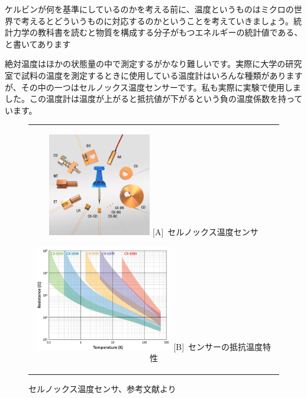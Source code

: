 \documentclass[10pt,b5paper,papersize,dvipdfmx]{jsbook}
\begin{document}
ケルビンが何を基準にしているのかを考える前に、温度というものはミクロの世界で考えるとどういうものに対応するのかということを考えていきましょう。統計力学の教科書を読むと物質を構成する分子がもつエネルギーの統計値である、と書いてあります\par
絶対温度はほかの状態量の中で測定するがかなり難しいです。実際に大学の研究室で試料の温度を測定するときに使用している温度計はいろんな種類がありますが、その中の一つはセルノックス温度センサーです。私も実際に実験で使用しました。この温度計は温度が上がると抵抗値が下がるという負の温度係数を持っています。
\begin{figure}[htbp]
  \begin{center}
      \begin{tabular}{c}
      \begin{minipage}{0.5\hsize}
          \begin{center}
          \includegraphics[clip, width=4.5cm]{img/cryotronics.png}
          \hspace{1.6cm} [A]\ セルノックス温度センサ
          \end{center}
      \end{minipage}
      \begin{minipage}{0.5\hsize}
          \begin{center}
          \includegraphics[clip, width=6cm]{img/CX-chart-1.png}
          \hspace{1.6cm} [B]\ センサーの抵抗温度特性
          \end{center}
      \end{minipage}
  
      \end{tabular}
      \caption{セルノックス温度センサ、参考文献\cite{ondo}より}
      \label{fig:cryotronics}
  \end{center}
\end{figure}
\end{document}
